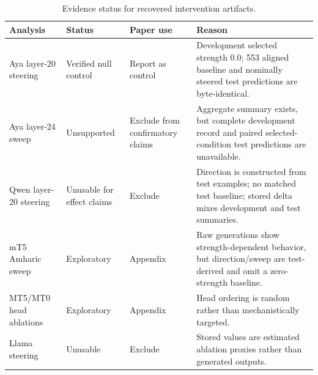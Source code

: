 \begin{table}[t]
\centering
\small
\begin{tabular}{p{}p{}p{}p{}}
\toprule
Analysis & Status & Paper use & Reason \\
\midrule
Aya layer-20 steering & Verified null control & Report as control & Development selected strength 0.0; 553 aligned baseline and nominally steered test predictions are byte-identical. \\
Aya layer-24 sweep & Unsupported & Exclude from confirmatory claims & Aggregate summary exists, but complete development record and paired selected-condition test predictions are unavailable. \\
Qwen layer-20 steering & Unusable for effect claims & Exclude & Direction is constructed from test examples; no matched test baseline; stored delta mixes development and test summaries. \\
mT5 Amharic sweep & Exploratory & Appendix & Raw generations show strength-dependent behavior, but direction/sweep are test-derived and omit a zero-strength baseline. \\
MT5/MT0 head ablations & Exploratory & Appendix & Head ordering is random rather than mechanistically targeted. \\
Llama steering & Unusable & Exclude & Stored values are estimated ablation proxies rather than generated outputs. \\
\bottomrule
\end{tabular}
\caption{Evidence status for recovered intervention artifacts.}
\label{tab:intervention-audit}
\end{table}
